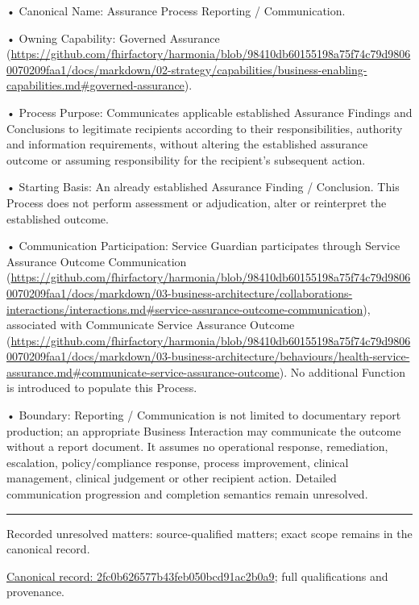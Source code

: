 •
Canonical Name: Assurance Process Reporting / Communication.



•
Owning Capability: Governed Assurance (\url{https://github.com/fhirfactory/harmonia/blob/98410db60155198a75f74c79d98060070209faa1/docs/markdown/02-strategy/capabilities/business-enabling-capabilities.md#governed-assurance}).



•
Process Purpose: Communicates applicable established Assurance Findings and Conclusions to legitimate recipients according to their responsibilities, authority and information requirements, without altering the established assurance outcome or assuming responsibility for the recipient's subsequent action.



•
Starting Basis: An already established Assurance Finding / Conclusion. This Process does not perform assessment or adjudication, alter or reinterpret the established outcome.



•
Communication Participation: Service Guardian participates through Service Assurance Outcome Communication (\url{https://github.com/fhirfactory/harmonia/blob/98410db60155198a75f74c79d98060070209faa1/docs/markdown/03-business-architecture/collaborations-interactions/interactions.md#service-assurance-outcome-communication}), associated with Communicate Service Assurance Outcome (\url{https://github.com/fhirfactory/harmonia/blob/98410db60155198a75f74c79d98060070209faa1/docs/markdown/03-business-architecture/behaviours/health-service-assurance.md#communicate-service-assurance-outcome}). No additional Function is introduced to populate this Process.



•
Boundary: Reporting / Communication is not limited to documentary report production; an appropriate Business Interaction may communicate the outcome without a report document. It assumes no operational response, remediation, escalation, policy/compliance response, process improvement, clinical management, clinical judgement or other recipient action. Detailed communication progression and completion semantics remain unresolved.



\medskip\hrule\medskip

{\small Recorded unresolved matters: source-qualified matters; exact scope remains in the canonical record.}\par
{\footnotesize \href{../../../../continuum/business/business-process/2fc0b626577b43feb050bcd91ac2b0a9.md}{Canonical record: 2fc0b626577b43feb050bcd91ac2b0a9}; full qualifications and provenance.}\par
